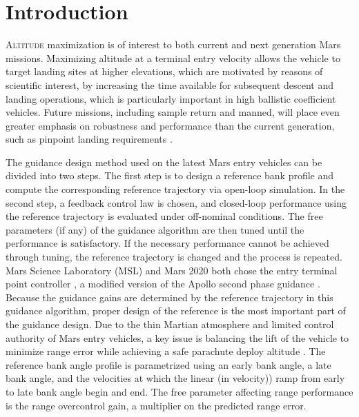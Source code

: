 \documentclass[journal ]{new-aiaa}
\begin{document}
\section*{Introduction}


\lettrine{A}{ltitude} maximization is of interest to both current and next generation Mars missions. Maximizing altitude at a terminal entry velocity allows the vehicle to target landing sites at higher elevations, which are motivated by reasons of scientific interest, by increasing the time available for subsequent descent and landing operations, which is particularly important in high ballistic coefficient vehicles. Future missions, including sample return \cite{MSR} and manned, will place even greater emphasis on robustness and performance than the current generation, such as pinpoint landing requirements \cite{EvolvableMars}. 

The guidance design method used on the latest Mars entry vehicles \cite{MSL_EDL2,M2020_EDL} can be divided into two steps. The first step is to design a reference bank profile and compute the corresponding reference trajectory via open-loop simulation. In the second step, a feedback control law is chosen, and closed-loop performance using the reference trajectory is evaluated under off-nominal conditions. The free parameters (if any) of the guidance algorithm are then tuned until the performance is satisfactory. If the necessary performance cannot be achieved through tuning, the reference trajectory is changed and the process is repeated. 
Mars Science Laboratory (MSL) and Mars 2020 both chose the entry terminal point controller \cite{MSL_EDL, M2020_EDL}, a modified version of the Apollo second phase guidance \cite{MSL_EDL2}. Because the guidance gains are determined by the reference trajectory in this guidance algorithm, proper design of the reference is the most important part of the guidance design. Due to the thin Martian atmosphere and limited control authority of Mars entry vehicles, a key issue is balancing the lift of the vehicle to minimize range error while achieving a safe parachute deploy altitude \cite{MSL_EDL2}. The reference bank angle profile is parametrized using an early bank angle, a late bank angle, and the velocities at which the linear (in velocity)) ramp from early to late bank angle begin and end. The free parameter affecting range performance is the range overcontrol gain, a multiplier on the predicted range error. 
\end{document}
